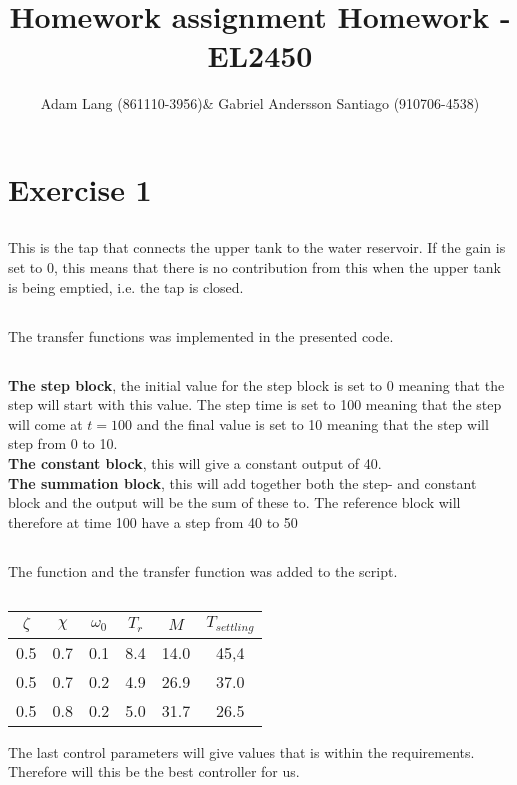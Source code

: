 \documentclass[12pt,a4paper]{article}
\title{Homework assignment Homework - EL2450}
\author{Adam Lang (861110-3956)& Gabriel Andersson Santiago
(910706-4538)}
\begin{document}
\maketitle

\section{Exercise 1}  

  \subsection{}%
  This is the tap that connects the upper tank to the water reservoir.
  If the gain is set to 0, this means that there is no contribution from
  this when the upper tank is being emptied, i.e. the tap is closed.
  
  \subsection{}%
  The transfer functions was implemented in the presented code.
  
  \subsection{}%
  \textbf{The step block}, the initial value for the step block is set to 
  0 meaning that the step will start with this value. The step time is
  set to 100 meaning that the step will come at $t=100$ and the final
  value is set to 10 meaning that the step will step from 0 to 10.\\
  \textbf{The constant block}, this will give a constant output of 40.\\
  \textbf{The summation block}, this will add together both the step-
  and constant block and the output will be the sum of these to. The
  reference block will therefore at time 100 have a step from 40 to 50

  \subsection{}%
  The function and the transfer function was added to the script.

  \subsection{}%
  \begin{center}
    \begin{tabular}{|c | c | c | c | c | c |}
      \hline
      $\zeta$ & $\chi$ & $\omega_0$ & $T_r$ & $M$ & $T_{settling}$ \\
      \hline
      0.5 & 0.7 & 0.1 & 8.4 & 14.0 & 45,4 \\ 
      0.5 & 0.7 & 0.2 & 4.9 & 26.9 & 37.0 \\ 
      0.5 & 0.8 & 0.2 & 5.0 & 31.7 & 26.5 \\ \hline
    \end{tabular}
  \end{center}
  The last control parameters will give values that is within the
  requirements. Therefore will this be the best controller for us. 
\end{document}
